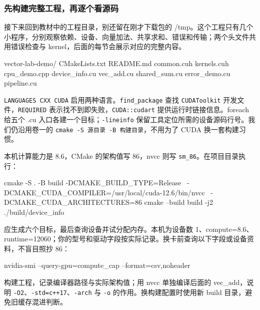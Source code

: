 \subsubsection{先构建完整工程，再逐个看源码}
接下来回到教材中的工程目录，别还留在刚才下载包的 /tmp。这个工程只有几个小程序，分别观察依赖、设备、向量加法、共享求和、错误和传输；两个头文件共用错误检查与 kernel，后面的每节会展示对应的完整内容。
\begin{tbash}
vector-lab-demo/
  CMakeLists.txt README.md common.cuh kernels.cuh
  cpu_demo.cpp device_info.cu vec_add.cu shared_sum.cu
  error_demo.cu pipeline.cu
\end{tbash}
\begin{cudablock}

\end{cudablock}
\texttt{LANGUAGES CXX CUDA} 启用两种语言。\texttt{find\_package} 查找 \texttt{CUDAToolkit} 开发文件，\texttt{REQUIRED} 表示找不到即失败，\texttt{CUDA::cudart} 提供运行时链接信息。foreach 给五个 .cu 入口各建一个目标；\texttt{-lineinfo} 保留工具定位所需的设备源码行号。我们仍沿用卷一的 \texttt{cmake -S 源目录 -B 构建目录}，不用为了 CUDA 换一套构建习惯。
\begin{example}[按自己的设备选择架构]
本机计算能力是 8.6，CMake 的架构值写 86，nvcc 则写 \texttt{sm\_86}。在项目目录执行：
\begin{tbash}
cmake -S . -B build -DCMAKE_BUILD_TYPE=Release \
  -DCMAKE_CUDA_COMPILER=/usr/local/cuda-12.6/bin/nvcc \
  -DCMAKE_CUDA_ARCHITECTURES=86
cmake --build build -j2
./build/device_info
\end{tbash}
应生成六个目标，最后查询设备并试分配内存。本机为设备数 1、compute=8.6、runtime=12060；你的型号和驱动字段按实际记录。换卡前查询以下字段或设备资料，不盲目照抄 86：
\begin{tbash}
nvidia-smi --query-gpu=compute_cap --format=csv,noheader
\end{tbash}
\end{example}
\begin{exercise}\label{ex:v2-cuda-build}
构建工程，记录编译器路径与实际架构值；用 nvcc 单独编译后面的 vec\_add，说明 \texttt{-O2}、\texttt{-std=c++17}、\texttt{-arch} 与 \texttt{-o} 的作用。换构建配置时使用新 build 目录，避免旧缓存混进判断。
\end{exercise}

